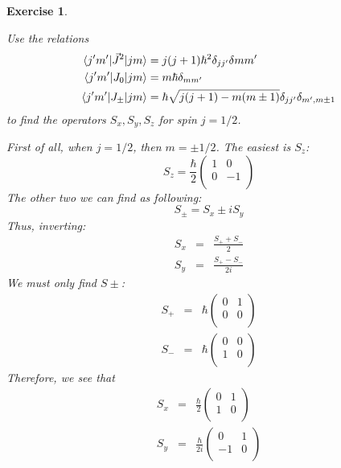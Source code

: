 \documentclass[12pt]{article}
\def\be{\begin{equation}}
\def\ee{\end{equation}}
\def\bea{\begin{eqnarray*}}
\def\eea{\end{eqnarray*}}
\def\f{\frac}
\newtheorem{exercise}{Exercise}
\begin{document}
	\begin{exercise}
		\begin{exercises}
			\item Use the relations
			\be
				\begin{aligned}
					\braket{j'm' | \vec{J}^2 | jm} &= j(j+1)\hbar^2\delta_{jj'}\delta{mm'} \\
					\braket{j'm' | J_0 | jm} &= m\hbar \delta_{mm'} \\
					\braket{j'm' | J_\pm | jm} &= \hbar \sqrt{j(j+1) - m(m \pm 1)} \delta_{jj'}\delta_{m',m\pm1}
				\end{aligned}
			\ee
			to find the operators $S_x, S_y, S_z$ for spin $j=1/2$.
			\begin{multianswer}
				First of all, when $j=1/2$, then $m=\pm 1/2$. The easiest is $S_z$:
				\be
					S_z = \f{\hbar}{2}
					\begin{pmatrix}
						1 & 0 \\
						0 & -1 \\
					\end{pmatrix}
				\ee
				The other two we can find as following:
				\be
					S_\pm = S_x \pm iS_y
				\ee
				Thus, inverting:
				\bea
					S_x &=& \f{S_+ + S_-}{2} \\
					S_y &=& \f{S_+ - S_-}{2i}
				\eea
				We must only find $S\pm$:
				\bea
					S_+ &=& \hbar
						\begin{pmatrix}
							0 & 1 \\
							0 & 0 \\
						\end{pmatrix} \\
					S_- &=& \hbar
					\begin{pmatrix}
						0 & 0 \\
						1 & 0 \\
					\end{pmatrix}
				\eea
				Therefore, we see that
				\bea
					S_x &=& \f{\hbar}{2}
						\begin{pmatrix}
							0 & 1 \\
							1 & 0 \\
						\end{pmatrix} \\
					S_y &=& \f{\hbar}{2i}
					\begin{pmatrix}
						0 & 1 \\
						-1 & 0 \\
					\end{pmatrix} 
				\eea 
			\end{multianswer}
			

\end{exercises}
\end{exercise}
\end{document}
